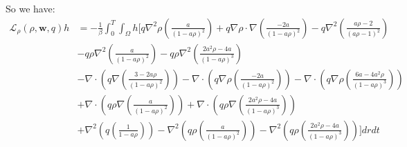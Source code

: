 \documentclass[11pt, a4paper]{article}
\theoremstyle{definition}
\newcommand{\w}{\mathbf{w}}
\begin{document}
So we have:
\begin{align*}
	\mathcal{L}_\rho(\rho,\w,q)h &= -\frac{1}{\beta}\int_0^T\int_\Omega h \bigg[  q\nabla^2 \rho \left(\frac{a}{(1- a\rho)^2}\right)  + q \nabla \rho \cdot \nabla \left(\frac{-2a }{(1-a\rho)^2} \right) - q \nabla^2 \left(\frac{a\rho -2}{(a\rho -1)^2}\right)\\
	&- q\rho  \nabla^2  \left(\frac{a }{(1-a\rho)^2} \right) - q\rho  \nabla^2  \left(\frac{2a^2\rho -4a}{(1-a\rho)^3} \right)\\
	& -\nabla \cdot \left( q  \nabla \left( \frac{3-2a\rho}{(1-a\rho)^2} \right) \right) - \nabla \cdot \left( q \nabla \rho  \left( \frac{-2a }{(1-a\rho)^2} \right)\right)  - \nabla \cdot \left( q \nabla \rho  \left(\frac{6a-4a^2  \rho}{(1-a\rho)^3}  \right)\right)  \\
	& + \nabla \cdot\left( q\rho \nabla \left(\frac{a }{(1-a\rho)^2} \right) \right) + \nabla \cdot\left( q\rho \nabla \left( \frac{2a^2\rho -4a}{(1-a\rho)^3} \right) \right)\\
	&+   \nabla^2 \left(q \left(\frac{1}{1- a\rho} \right) \right) - \nabla^2 \left(q\rho  \left(\frac{a }{(1-a\rho)^2}\right)\right) - \nabla^2 \left(q\rho \left(\frac{2a^2\rho -4a}{(1-a\rho)^3} \right)\right)\bigg] dr dt 
\end{align*}
\end{document}
